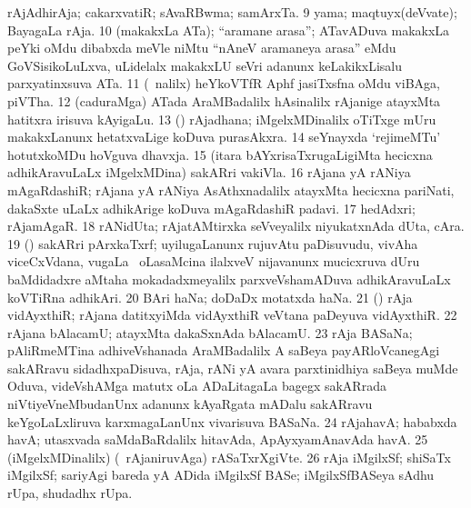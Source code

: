 { rAjAdhirAja; cakarxvatiR; sAvaRBwma; samArxTa. 
\num{9}  yama; maqtuyx(deVvate); BayagaLa rAja. 
\num{10}  (makakxLa ATa); ``aramane arasa''; ATavADuva makakxLa peYki oMdu dibabxda meVle niMtu ``nAneV aramaneya arasa'' eMdu GoVSisikoLuLxva, uLidelalx makakxLU seVri adanunx keLakikxLisalu parxyatinxsuva ATa. 
\num{11}  (\UK\ nalilx)
heYkoVTfR Aphf jasiTxsfna oMdu viBAga, piVTha. 
\num{12}  (caduraMga) ATada AraMBadalilx hAsinalilx rAjanige atayxMta hatitxra irisuva kAyigaLu.
\num{13}  (\ca) rAjadhana; iMgelxMDinalilx oTiTxge mUru makakxLanunx hetatxvaLige koDuva purasAkxra.  
\num{14}  seYnayxda `rejimeMTu'
hotutxkoMDu hoVguva dhavxja. 
\num{15}  (itara bAYxrisaTxrugaLigiMta hecicxna adhikAravuLaLx iMgelxMDina) sakARri vakiVla.  
\num{16}  rAjana yA rANiya mAgaRdashiR; rAjana yA rANiya AsAthxnadalilx atayxMta hecicxna 
pariNati, dakaSxte uLaLx adhikArige koDuva mAgaRdashiR padavi. 
\num{17}  hedAdxri; rAjamAgaR. 
\num{18}  rANidUta; rAjatAMtirxka seVveyalilx niyukatxnAda dUta, cAra.  
\num{19}  (\birx) sakARri pArxkaTxrf; uyilugaLanunx rujuvAtu paDisuvudu, vivAha viceCxVdana, \mo vugaLa 
\vi\ oLasaMcina ilalxveV nijavanunx mucicxruva dUru baMdidadxre aMtaha mokadadxmeyalilx parxveVshamADuva adhikAravuLaLx
koVTiRna adhikAri.
\num{20}  BAri haNa; doDaDx motatxda haNa. 
\num{21}  (\birx) rAja vidAyxthiR; rAjana datitxyiMda vidAyxthiR veVtana paDeyuva vidAyxthiR. 
\num{22}  rAjana bAlacamU; atayxMta dakaSxnAda bAlacamU. 
\num{23}  rAja BASaNa; pAliRmeMTina adhiveVshanada AraMBadalilx A saBeya payARloVcanegAgi sakARravu 
sidadhxpaDisuva, rAja, rANi yA avara parxtinidhiya saBeya muMde Oduva, videVshAMga matutx oLa ADaLitagaLa bagegx sakARrada 
niVtiyeVneMbudanUnx  adanunx kAyaRgata mADalu sakARravu keYgoLaLxliruva karxmagaLanUnx vivarisuva BASaNa. 
\num{24}  rAja{ha}vA; hababxda havA; utasxvada saMdaBaRdalilx hitavAda, ApAyxyamAnavAda havA. 
\num{25}  (iMgelxMDinalilx) (\kanmu\ rAjaniruvAga) rASaTxrXgiVte. 
\num{26}  rAja iMgilxSf; shiSaTx iMgilxSf; sariyAgi bareda yA ADida iMgilxSf BASe; iMgilxSfBASeya sAdhu rUpa,
shudadhx rUpa.}
\eentry

